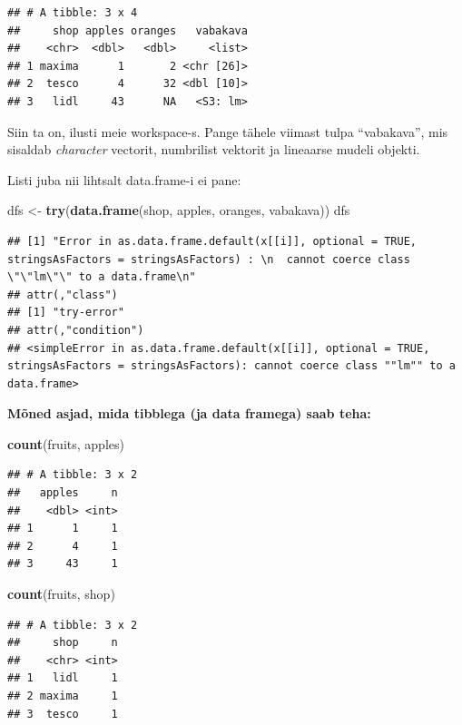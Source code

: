 \documentclass[]{book}
\newenvironment{Shaded}{\begin{snugshade}}{\end{snugshade}}
\newcommand{\KeywordTok}[1]{\textcolor[rgb]{0.13,0.29,0.53}{\textbf{#1}}}
\newcommand{\StringTok}[1]{\textcolor[rgb]{0.31,0.60,0.02}{#1}}
\newcommand{\NormalTok}[1]{#1}
\begin{document}
\begin{verbatim}
## # A tibble: 3 x 4
##     shop apples oranges   vabakava
##    <chr>  <dbl>   <dbl>     <list>
## 1 maxima      1       2 <chr [26]>
## 2  tesco      4      32 <dbl [10]>
## 3   lidl     43      NA   <S3: lm>
\end{verbatim}

Siin ta on, ilusti meie workspace-s. Pange tähele viimast tulpa
``vabakava'', mis sisaldab \emph{character} vectorit, numbrilist
vektorit ja lineaarse mudeli objekti.

Listi juba nii lihtsalt data.frame-i ei pane:

\begin{Shaded}
\begin{Highlighting}[]
\NormalTok{dfs <-}\StringTok{ }\KeywordTok{try}\NormalTok{(}\KeywordTok{data.frame}\NormalTok{(shop, apples, oranges, vabakava))}
\NormalTok{dfs}
\end{Highlighting}
\end{Shaded}

\begin{verbatim}
## [1] "Error in as.data.frame.default(x[[i]], optional = TRUE, stringsAsFactors = stringsAsFactors) : \n  cannot coerce class \"\"lm\"\" to a data.frame\n"
## attr(,"class")
## [1] "try-error"
## attr(,"condition")
## <simpleError in as.data.frame.default(x[[i]], optional = TRUE, stringsAsFactors = stringsAsFactors): cannot coerce class ""lm"" to a data.frame>
\end{verbatim}

\textbf{Mõned asjad, mida tibblega (ja data framega) saab teha:}

\begin{Shaded}
\begin{Highlighting}[]
\KeywordTok{count}\NormalTok{(fruits, apples)}
\end{Highlighting}
\end{Shaded}

\begin{verbatim}
## # A tibble: 3 x 2
##   apples     n
##    <dbl> <int>
## 1      1     1
## 2      4     1
## 3     43     1
\end{verbatim}

\begin{Shaded}
\begin{Highlighting}[]
\KeywordTok{count}\NormalTok{(fruits, shop)}
\end{Highlighting}
\end{Shaded}

\begin{verbatim}
## # A tibble: 3 x 2
##     shop     n
##    <chr> <int>
## 1   lidl     1
## 2 maxima     1
## 3  tesco     1
\end{verbatim}
\end{document}
